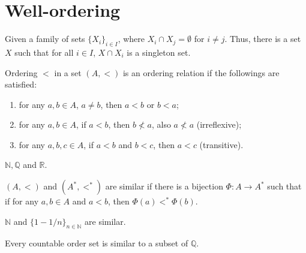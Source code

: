 \section{Well-ordering}
\begin{theorem}\label{axiom_of_choice}
Given a family of sets $\{X_i\}_{i \in I}$, where $X_i \cap X_j = \emptyset$ for $i \neq j$. Thus, there is a set $X$ such that for all $i \in I$, $X \cap X_i$ is a singleton set.
\end{theorem}

\medskip

\begin{definition}
Ordering $<$ in a set $(A, <)$ is an ordering relation if the followings are satisfied:
\begin{enumerate}[label=(\alph*)]
    \item for any $a, b \in A$, $a \neq b$, then $a < b$ or $b < a$;
    
    \item for any $a, b \in A$, if $a < b$, then $b \nless a$, also $a \nless a$ (irreflexive);
    
    \item for any $a, b, c \in A$, if $a < b$ and $b < c$, then $a < c$ (transitive).
\end{enumerate}
\end{definition}

\medskip

\begin{example}
$\mathbb{N}, \mathbb{Q}$ and $\mathbb{R}$.
\end{example}

\medskip

\begin{definition}
$(A, <)$ and $(A^*, <^*)$ are similar if there is a bijection $\Phi: A \to A^*$ such that if for any $a, b \in A$ and $a < b$, then $\Phi(a) <^* \Phi(b)$.
\end{definition}

\medskip

\begin{example}
$\mathbb{N}$ and $\{1 - 1/n\}_{n \in \mathbb{N}}$ are similar.
\end{example}

\medskip

\begin{theorem}
Every countable order set is similar to a subset of $\mathbb{Q}$.
\end{theorem}

\medskip

